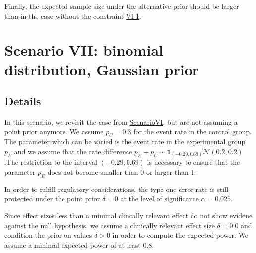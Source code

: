 \documentclass[
]{book}
\newenvironment{Shaded}{\begin{snugshade}}{\end{snugshade}}
\newcommand{\DecValTok}[1]{\textcolor[rgb]{0.00,0.00,0.81}{#1}}
\newcommand{\FunctionTok}[1]{\textcolor[rgb]{0.00,0.00,0.00}{#1}}
\newcommand{\NormalTok}[1]{#1}
\newcommand{\SpecialCharTok}[1]{\textcolor[rgb]{0.00,0.00,0.00}{#1}}
\newcommand{\StringTok}[1]{\textcolor[rgb]{0.31,0.60,0.02}{#1}}
\begin{document}
Finally, the expected sample size under the alternative prior should be larger than in the case without the constraint \protect\hyperlink{ux5cux23variantVI_1}{VI-1}.

\begin{Shaded}
\end{Shaded}

\hypertarget{scenarioVII}{%
\chapter{Scenario VII: binomial distribution, Gaussian prior}\label{scenarioVII}}

\hypertarget{details-6}{%
\section{Details}\label{details-6}}

In this scenario, we revisit the case from \protect\hyperlink{variantVI}{ScenarioVI}, but are not assuming a point prior anymore.
We assume \(p_C=0.3\) for the event rate in the control group. The parameter which can be varied is the event rate in the experimental group \(p_E\) and we assume that the rate difference \(p_E-p_C \sim \textbf{1}_{(-0.29,0.69)} \mathcal{N}(0.2,0.2)\).The restriction to the interval \((-0.29,0.69)\) is necessary to ensure that the parameter \(p_E\) does not become smaller than \(0\) or larger than \(1\).

In order to fulfill regulatory considerations, the type one error rate is still protected under the point prior \(\delta=0\) at the level of significance \(\alpha=0.025\).

Since effect sizes less than a minimal clincally relevant effect do not show evidene against the null hypothesis, we assume a clinically relevant effect size \(\delta =0.0\) and condition the prior on values \(\delta > 0\) in order to compute the expected power. We assume a minimal expected power of at least \(0.8\).
\end{document}
